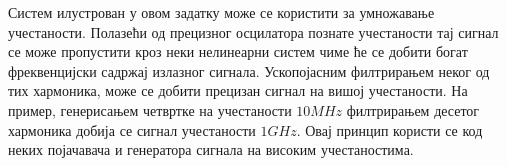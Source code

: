 Систем илустрован у овом задатку може се користити за умножавање учестаности. Полазећи од прецизног осцилатора познате учестаности 
тај сигнал се може пропустити кроз неки нелинеарни систем чиме ће се добити богат фреквенцијски садржај излазног сигнала. Ускопојасним 
филтрирањем неког од тих хармоника, може се добити прецизан сигнал на вишој учестаности. На пример, генерисањем четвртке на учестаности 
$10\unit{MHz}$ филтрирањем десетог хармоника добија се сигнал учестаности $1\unit{GHz}$. Овај принцип користи се код неких појачавача 
и генератора сигнала на високим учестаностима. 